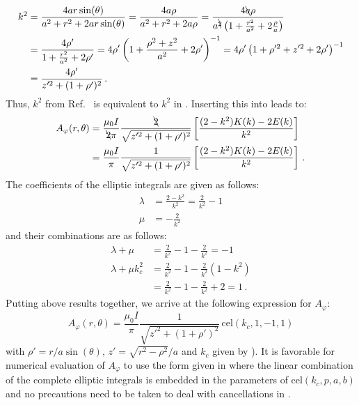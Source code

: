 \begin{align}
  k^2 &= \frac{4 a r \sin(\theta)}{a^2 + r^2 + 2 a r \sin(\theta)}
       = \frac{4 a \rho}{a^2 + r^2 + 2 a \rho}
       = \frac{4 \bcancel{a} \rho}{a^{\bcancel{2}} \left(1 + \frac{r^2}{a^2} + 2 \frac{\rho}{a} \right)} \nonumber \\
  ~   &= \frac{4 \rho'}{1 + \frac{r^2}{a^2} + 2 \rho'}
       = 4 \rho' \left( 1 + \frac{\rho^2 + z^2}{a^2} + 2 \rho' \right)^{-1}
       = 4 \rho' \left( 1 + \rho'^{2} + z'^{2} + 2 \rho' \right)^{-1} \nonumber \\
  ~   &= \frac{4 \rho'}{z'^2 + (1 + \rho')^2} \, .
\end{align}
Thus, $k^2$ from Ref.~\cite{jackson} is equivalent to $k^2$ in .
Inserting this into  leads to:
\begin{align}
  A_\varphi(r, \theta) &= \frac{\mu_0 I}{\bcancel{2} \pi}
                          \frac{\bcancel{2}}{\sqrt{z'^2 + (1 + \rho')^2}}
                          \left[
                            \frac{(2 - k^2)K(k) - 2 E(k)}{k^2}
                          \right] \nonumber \\
           ~           &= \frac{\mu_0 I}{\pi}
                          \frac{1}{\sqrt{z'^2 + (1 + \rho')^2}}
                          \left[
                            \frac{(2 - k^2)K(k) - 2 E(k)}{k^2}
                          \right] \, .
\end{align}
The coefficients of the elliptic integrals are given as follows:
\begin{align}
  \lambda &= \frac{2 - k^2}{k^2} = \frac{2}{k^2} - 1 \\
  \mu     &= -\frac{2}{k^2}
\end{align}
and their combinations are as follows:
\begin{align}
  \lambda + \mu       &= \frac{2}{k^2} - 1 - \frac{2}{k^2}     = -1 \\
  \lambda + \mu k_c^2 &= \frac{2}{k^2} - 1 - \frac{2}{k^2} (1 - k^2) \nonumber \\
          ~           &= \frac{2}{k^2} - 1 - \frac{2}{k^2} + 2 =  1 \, .
\end{align}
Putting above results together, we arrive at the following expression for $A_\varphi$:
\begin{equation}
 \boxed{A_\varphi(r, \theta) = \frac{\mu_0 I}{\pi}
                            \frac{1}{\sqrt{z'^2 + (1 + \rho')^2}} \,\mathrm{cel}(k_c, 1, -1, 1)}
\end{equation}
with $\rho' = r/a \sin(\theta)$, $z' = \sqrt{r^2 - \rho^2}/a$ and $k_c$ given by ).
It is favorable for numerical evaluation of $A_\varphi$ to use the form given in 
where the linear combination of the complete elliptic integrals is embedded in the parameters of $\mathrm{cel}(k_c, p, a, b)$
and no precautions need to be taken to deal with cancellations in .

